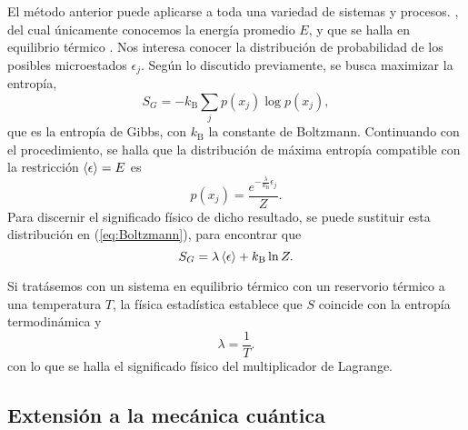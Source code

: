 El método anterior puede aplicarse a toda una variedad de sistemas y procesos. , del cual únicamente conocemos la energía promedio $E$, y que se halla en equilibrio térmico . Nos interesa conocer la distribución de probabilidad de los posibles microestados $\epsilon_{j}$. Según lo discutido previamente, se busca maximizar la entropía,
\begin{equation}\label{eq:GibbsEntropy}
    S_{G}=-k_{\text{B}}\sum_{j}p(x_{j})\log{p(x_{j})},
\end{equation}
que es la entropía de Gibbs, con $k_{\text{B}}$ la constante de Boltzmann. Continuando con el procedimiento, se halla que la distribución de máxima entropía compatible con la restricción $\expval{\epsilon}=E$ es
\begin{equation}\label{eq:Boltzmann}
    p(x_{j})=\frac{e^{-\frac{\lambda}{k_{\text{B}}}\epsilon_{j}}}{Z}.
\end{equation}
Para discernir el significado físico de dicho resultado, se puede sustituir esta distribución en (\ref{eq:Boltzmann}), para encontrar que
\begin{equation}
    S_{G}=\lambda\expval{\epsilon}+k_{\text{B}}\ln{Z}.
\end{equation}

Si tratásemos con un sistema en equilibrio térmico con un reservorio térmico a una temperatura $T$, la física estadística establece que $S$ coincide con la entropía termodinámica y
\begin{equation}
    \lambda=\frac{1}{T}.\nonumber
\end{equation}
con lo que se halla el significado físico del multiplicador de Lagrange. \cite{Greiner}

\subsection{Extensión a la mecánica cuántica}

